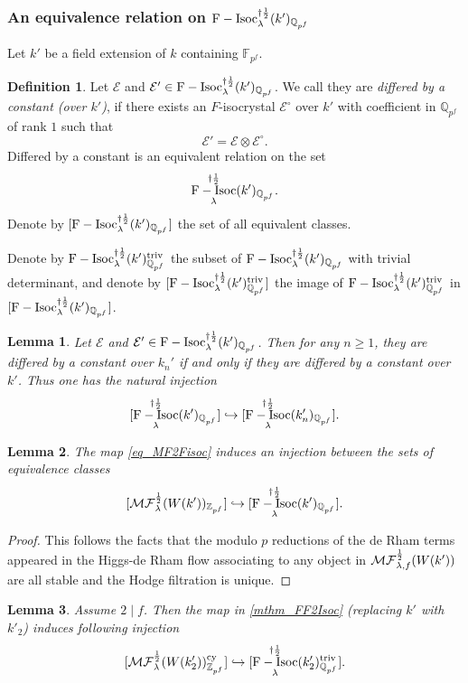 \documentclass[12pt,twoside]{book}
\theoremstyle{plain}
\newtheorem{lemma}[lemma]{Lemma}
\theoremstyle{definition}
\newtheorem{definition}[definition]{Definition}
\theoremstyle{remark}
\newcommand{\bF}{{\mathbb F}}
\newcommand{\bQ}{{\mathbb Q}}
\newcommand{\bZ}{{\mathbb Z}}
\newcommand{\mE}{{\mathcal E}}
\newcommand{\MF}{\mathcal{MF}}
\DeclareMathOperator{\FIsoc}{F-Isoc}
\numberwithin{equation}{section}
\def\FIsoch{{\FIsoc^{\dagger{1\over 2}}_{\lambda} }}
\def\MFh{\MF^{{1\over 2}}_{\lambda}}
\def\MFhf{\MF^{{1\over 2}}_{\lambda,f}}
\begin{document}
\subsubsection{An equivalence relation on $\FIsoch(k')_{\bQ_{p^f}}$}

Let $k'$ be a field extension of $k$ containing $\bF_{p^f}$.

\begin{definition}
Let $\mE$ and $\mE'\in\FIsoch(k')_{\bQ_{p^f}}$. We call they are \emph{differed by a constant (over $k'$)}, if there exists an $F$-isocrystal $\mE^\circ$ over $k'$ with coefficient in $\bQ_{p^f}$ of rank $1$ such that
\[\mE' = \mE \otimes \mE^\circ.\]
Differed by a constant is an equivalent relation on the set
\[\FIsoch(k')_{\bQ_{p^f}}.\]
Denote by $[\FIsoch(k')_{\bQ_{p^f}}]$ the set of all equivalent classes.
\end{definition}

Denote by $\FIsoch(k')_{\bQ_{p^f}}^{\rm triv}$ the subset of $\FIsoch(k')_{\bQ_{p^f}}$ with trivial determinant, and denote by $[\FIsoch(k')_{\bQ_{p^f}}^{\rm triv}]$ the image of $\FIsoch(k')_{\bQ_{p^f}}^{\rm triv}$ in $[\FIsoch(k')_{\bQ_{p^f}}]$.

\begin{lemma} \label{mthm_Fisok2Fisokn}
Let $\mE$ and $\mE'\in\FIsoch(k')_{\bQ_{p^f}}$. Then for any $n\geq1$, they are differed by a constant over $k_n'$ if and only if they are differed by a constant over $k'$. Thus one has the natural injection
\[[\FIsoch(k')_{\bQ_{p^f}}] \hookrightarrow [\FIsoch(k'_n)_{\bQ_{p^f}}].\]
\end{lemma}

\begin{lemma} \label{mthm_FF2Isoc}
The map \eqref{eq_MF2Fisoc} induces an injection between the sets of equivalence classes
\[[\MFh(W(k'))_{\bZ_{p^f}}] \hookrightarrow [\FIsoch(k')_{\bQ_{p^f}}].\]
\end{lemma}

\begin{proof}
This follows the facts that the modulo $p$ reductions of the de Rham terms appeared in the Higgs-de Rham flow associating to any object in $\MFhf(W(k'))$ are all stable and the Hodge filtration is unique.
\end{proof}

\begin{lemma} \label{mthm_FF2Isoc_classes}
Assume $2\mid f$. Then the map in \autoref{mthm_FF2Isoc} (replacing $k'$ with $k'_2$) induces following injection
\[[\MFh(W(k_2'))_{\bZ_{p^f}}^{\rm cy}] \hookrightarrow [\FIsoch(k'_2)_{\bQ_{p^f}}^{\rm triv}].\]
\end{lemma}
\end{document}
